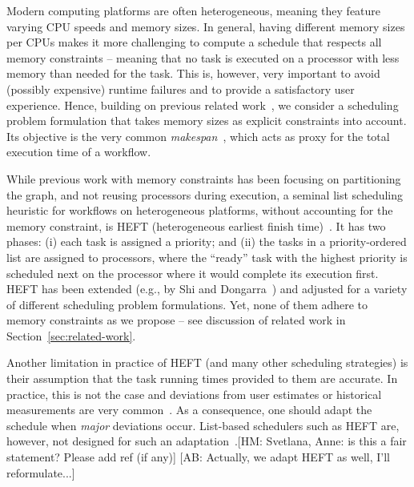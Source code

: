 \documentclass[conference]{IEEEtran}
\newcommand{\skug}[1]{{\color{blue}[SK: #1]}}
\newcommand{\hmey}[1]{{\color{red}[HM: #1]}}
\newcommand{\AB}[1]{{\color{purple}[AB: #1]}}
\begin{document}
    Modern computing platforms are often heterogeneous, meaning they feature varying CPU speeds
    and memory sizes. In general, having different memory sizes per CPUs makes it more challenging to compute
    a schedule that respects all memory constraints -- meaning that no task is executed on a 
    processor with less memory than needed for the task. This is, however, very important to
    avoid (possibly expensive) runtime failures and to provide a satisfactory user experience.
    Hence, building on previous related %
    work~\cite{gou2020partitioning,He21,DBLP:conf/icpp/KulaginaMB24}, we consider a scheduling problem 
    formulation that takes memory sizes as explicit constraints into account. Its objective is
    the very common \emph{makespan}~\cite{liu2018survey}, 
    which acts as proxy for the total execution time of a workflow.

    While previous work with memory constraints has been focusing on partitioning the graph, 
    and not reusing processors during execution, 
    a seminal list scheduling heuristic for workflows on heterogeneous platforms, without accounting
    for the memory constraint, is HEFT 
    (heterogeneous earliest finish time)~\cite{topcuoglu2002performance}.
    It has two phases: (i) each task is assigned a priority; and (ii) the tasks in a priority-ordered list are assigned
    to processors, where the ``ready'' task with the highest priority is scheduled next on the processor
    where it would complete its execution first. 
    HEFT has been extended (e.g., by Shi and Dongarra~\cite{SHI2006665}) and adjusted 
    for a variety of different scheduling problem formulations. 
    Yet, none of them adhere to memory constraints as we propose -- see discussion of related work
    in Section~\ref{sec:related-work}. 
        
    Another limitation in practice of HEFT (and many other scheduling strategies) is their 
    assumption that the task running times provided to them are accurate. In practice, this is 
    not the case and deviations from user estimates or historical measurements are 
    very common~\cite{hirales2012multiple}. As a consequence, one should adapt the schedule when \emph{major}
    deviations occur. List-based schedulers such as HEFT are, however, not designed for 
    such an adaptation~\cite{TODO}.\hmey{Svetlana, Anne: is this a fair statement? Please add ref (if any)}
    \AB{Actually, we adapt HEFT as well, I'll reformulate...}
    
\end{document}
